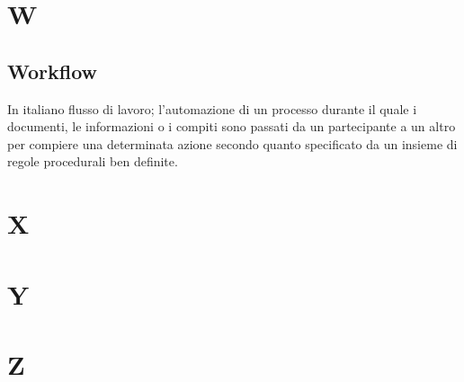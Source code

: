 \clearpage
\section*{W}

\subsection*{Workflow}
In italiano flusso di lavoro; l'automazione di un processo durante il quale i documenti, le informazioni o i compiti sono passati da un partecipante a un altro per compiere una determinata azione secondo quanto specificato da un insieme di regole procedurali ben definite.

\clearpage
\section*{X}

\clearpage
\section*{Y}

\clearpage
\section*{Z}
